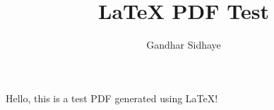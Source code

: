 \documentclass{article}
\title{LaTeX PDF Test}
\author{Gandhar Sidhaye}
\begin{document}
\maketitle
Hello, this is a test PDF generated using LaTeX!
\end{document}
